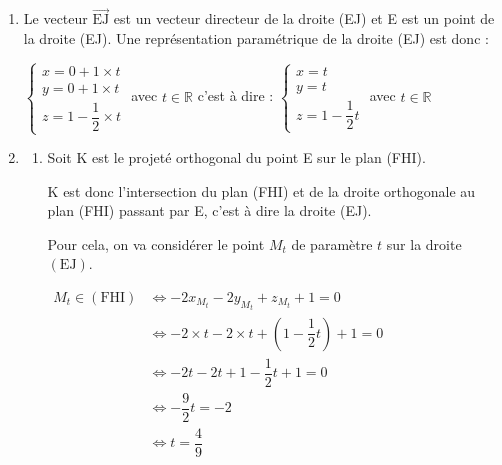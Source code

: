 \documentclass[10pt]{article}
\providecommand{\R}{\mathbb{R}}
\providecommand{\vect}[1]{\overrightarrow{#1}}
\begin{document}
\begin{enumerate}
Une équation cartésienne du plan (FHI)  est donc de la forme : \quad   $-2x-2y+z+d=0$ avec $d \in \R$.

De plus, le point F appartient au plan (FHI) donc ses coordonnées verifient l'équation du plan. On a donc :

$\begin{aligned}[t] \mathrm{F} \in (\mathrm{FHI}) &\iff -2\times x_\mathrm{F}  -2 \times y_\mathrm{F} + z_\mathrm{F} +d=0 \\
	&\iff -2\times 1  -2 \times 0 + 1 +d=0 \\
	&\iff -2+1+d=0 \\
	&\iff d=1\end{aligned}$

Une équation cartésienne du plan (FHI) est donc	$-2x-2y+ z+1=0$.
 \item Le vecteur $\vect{\text{EJ}} $ est un vecteur directeur de la droite (EJ) et E est un point de la droite (EJ).  Une représentation paramétrique de la droite (EJ) est donc :

$\begin{cases} x= 0 + 1\times t \\ y=0 + 1 \times t  \\ z=1 - \dfrac{1}{2} \times t  \end{cases} $ avec $t \in \R$ \quad c'est à dire \quad : $\begin{cases} x= t \\ y=t  \\ z=1 - \dfrac{1}{2} t  \end{cases} $ avec $t \in \R$

	\item
	\begin{enumerate}
		\item Soit K est le projeté orthogonal du point E sur le plan (FHI).

K est donc l'intersection du plan (FHI) et de la droite orthogonale au plan (FHI) passant par E, c'est à dire la droite (EJ).

Pour cela, on va considérer le point $M_t$ de paramètre $t$ sur la droite $(\mathrm{EJ})$.

$\begin{aligned} M_t \in (\mathrm{FHI}) &\iff -2x_{M_t} -2y_{M_t}+z_{M_t} +1 = 0\\
&\iff -2\times t -2  \times t  +  \left( 1- \dfrac{1}{2}t\right) +1=0 \\
&\iff -2t-2t+1-\dfrac{1}{2}t+1=0 \\
&\iff -\dfrac{9}{2}t = -2 \\
&\iff t= \dfrac{4}{9} \end{aligned}$


\end{enumerate}
\end{enumerate}
\end{document}
